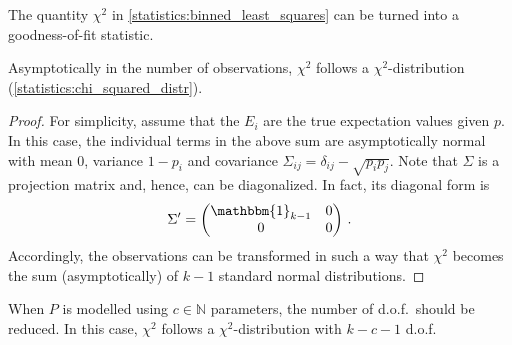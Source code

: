     The quantity $\chi^2$ in \cref{statistics:binned_least_squares} can be turned into a goodness-of-fit statistic.
    \begin{property}
        Asymptotically in the number of observations, $\chi^2$ follows a $\chi^2$-distribution (\cref{statistics:chi_squared_distr}).
        \begin{proof}
            For simplicity, assume that the $E_i$ are the true expectation values given $p$. In this case, the individual terms in the above sum are asymptotically normal with mean $0$, variance $1-p_i$ and covariance $\Sigma_{ij}=\delta_{ij}-\sqrt{p_ip_j}$. Note that $\Sigma$ is a projection matrix and, hence, can be diagonalized. In fact, its diagonal form is
            \begin{gather*}
                \Sigma'=
                \begin{pmatrix}
                    \mathbbm{1}_{k-1}&0\\
                    0&0
                \end{pmatrix}\,.
            \end{gather*}
            Accordingly, the observations can be transformed in such a way that $\chi^2$ becomes the sum (asymptotically) of $k-1$ standard normal distributions.
        \end{proof}
    \end{property}
    \begin{remark}
        When $P$ is modelled using $c\in\mathbb{N}$ parameters, the number of d.o.f.~should be reduced. In this case, $\chi^2$ follows a $\chi^2$-distribution with $k-c-1$ d.o.f.
    \end{remark}

